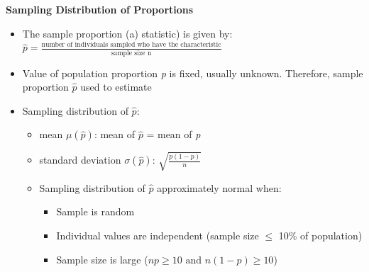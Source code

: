 \documentclass{article}
\begin{document}
\noindent
\textbf{Sampling Distribution of Proportions}
\begin{itemize}
    \item The sample proportion (a) statistic) is given by: \\
    \begin{math}\hat{p} = \frac{\textrm{number of individuals sampled who have the characteristic}}{\textrm{sample size n}}\end{math}
    \item Value of population proportion \emph{p} is fixed, usually unknown. Therefore, sample proportion \begin{math}\hat{p}\end{math} used to estimate
    \item Sampling distribution of \begin{math}\hat{p}\end{math}: \\
    \begin{itemize}
        \item mean \begin{math}\mu(\hat p)\end{math}: mean of \begin{math}\hat{p}\end{math} = mean of \emph{p}\\
        \item standard deviation \begin{math}\sigma(\hat p)\end{math}: \begin{math}
        \sqrt{\frac{p(1-p)}{n}}
        \end{math}
        \item Sampling distribution of \begin{math}\hat p\end{math} approximately normal when:
        \begin{itemize}
            \item Sample is random
            \item Individual values are independent (sample size \begin{math}\le\end{math} 10\% of population)
            \item Sample size is large (\begin{math} np \ge 10 \textrm{ and } n(1-p) \ge 10 \end{math}) 
        \end{itemize}
    \end{itemize}
\end{itemize}
\end{document}
